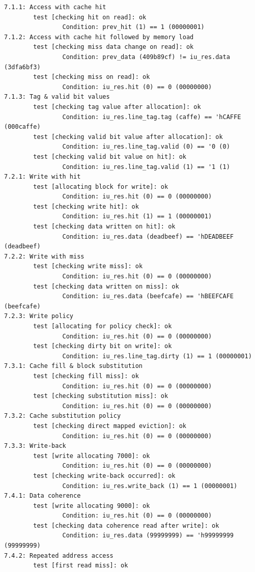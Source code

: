 \documentclass[12pt]{article}
\begin{document}
\begin{lstlisting}
7.1.1: Access with cache hit
        test [checking hit on read]: ok
                Condition: prev_hit (1) == 1 (00000001)
7.1.2: Access with cache hit followed by memory load
        test [checking miss data change on read]: ok
                Condition: prev_data (409b89cf) != iu_res.data (3dfa6bf3)
        test [checking miss on read]: ok
                Condition: iu_res.hit (0) == 0 (00000000)
7.1.3: Tag & valid bit values
        test [checking tag value after allocation]: ok
                Condition: iu_res.line_tag.tag (caffe) == 'hCAFFE (000caffe)
        test [checking valid bit value after allocation]: ok
                Condition: iu_res.line_tag.valid (0) == '0 (0)
        test [checking valid bit value on hit]: ok
                Condition: iu_res.line_tag.valid (1) == '1 (1)
7.2.1: Write with hit
        test [allocating block for write]: ok
                Condition: iu_res.hit (0) == 0 (00000000)
        test [checking write hit]: ok
                Condition: iu_res.hit (1) == 1 (00000001)
        test [checking data written on hit]: ok
                Condition: iu_res.data (deadbeef) == 'hDEADBEEF (deadbeef)
7.2.2: Write with miss
        test [checking write miss]: ok
                Condition: iu_res.hit (0) == 0 (00000000)
        test [checking data written on miss]: ok
                Condition: iu_res.data (beefcafe) == 'hBEEFCAFE (beefcafe)
7.2.3: Write policy
        test [allocating for policy check]: ok
                Condition: iu_res.hit (0) == 0 (00000000)
        test [checking dirty bit on write]: ok
                Condition: iu_res.line_tag.dirty (1) == 1 (00000001)
7.3.1: Cache fill & block substitution
        test [checking fill miss]: ok
                Condition: iu_res.hit (0) == 0 (00000000)
        test [checking substitution miss]: ok
                Condition: iu_res.hit (0) == 0 (00000000)
7.3.2: Cache substitution policy
        test [checking direct mapped eviction]: ok
                Condition: iu_res.hit (0) == 0 (00000000)
7.3.3: Write-back
        test [write allocating 7000]: ok
                Condition: iu_res.hit (0) == 0 (00000000)
        test [checking write-back occurred]: ok
                Condition: iu_res.write_back (1) == 1 (00000001)
7.4.1: Data coherence
        test [write allocating 9000]: ok
                Condition: iu_res.hit (0) == 0 (00000000)
        test [checking data coherence read after write]: ok
                Condition: iu_res.data (99999999) == 'h99999999 (99999999)
7.4.2: Repeated address access
        test [first read miss]: ok

\end{lstlisting}
\end{document}
